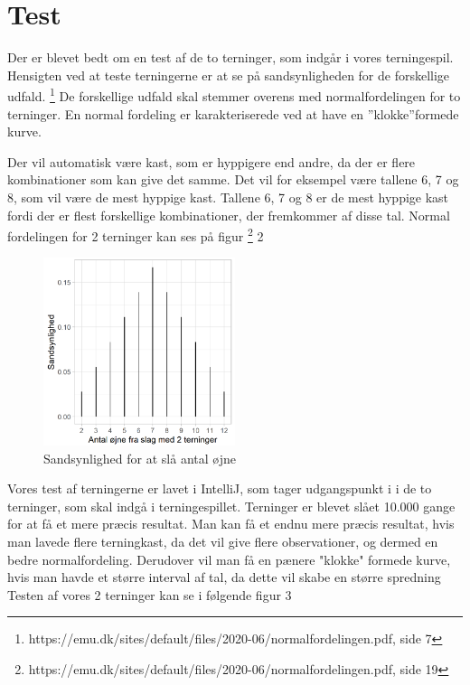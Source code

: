 \documentclass{article}
\begin{document}
\section{Test}
Der er blevet bedt om en test af de to terninger, som indgår i vores terningespil. Hensigten ved at teste terningerne er at se på sandsynligheden for de forskellige udfald. 
\footnote{https://emu.dk/sites/default/files/2020-06/normalfordelingen.pdf, side 7} De forskellige udfald skal stemmer overens med normalfordelingen for to terninger. En normal fordeling er karakteriserede ved at have en ”klokke”formede kurve. 

Der vil automatisk være kast, som er hyppigere end andre, da der er flere kombinationer som kan give det samme. Det vil for eksempel være tallene  6, 7 og 8, som vil være de mest hyppige kast. Tallene 6, 7 og 8 er de mest hyppige kast fordi der er flest forskellige kombinationer, der fremkommer af disse tal. 
Normal fordelingen for 2 terninger kan ses på figur \footnote{https://emu.dk/sites/default/files/2020-06/normalfordelingen.pdf, side 19} 2

\begin{figure} [h]
    \centering
    \includegraphics[width = 0.5\textwidth] {Billeder/normalfordelingen af 2 terninger.png}
    \caption{Sandsynlighed for at slå antal øjne}
    \label{fig:Sandsynligheden for at slå antal øjne}
\end{figure}


Vores test af terningerne er lavet i IntelliJ, som tager udgangspunkt i i de to terninger, som skal indgå i terningespillet. Terninger er blevet slået 10.000 gange for at få et mere præcis resultat. Man kan få et endnu mere præcis resultat, hvis man lavede flere terningkast, da det vil give flere observationer, og dermed en bedre normalfordeling. Derudover vil man få en pænere "klokke" formede kurve, hvis man havde et større interval af tal, da dette vil skabe en større spredning 
Testen af vores 2 terninger kan se i følgende figur 3
\end{document}
